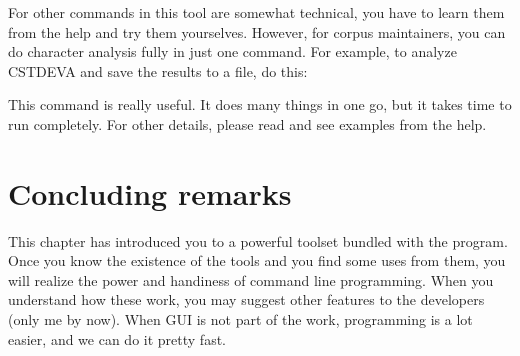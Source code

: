 For other commands in this tool are somewhat technical, you have to learn them from the help and try them yourselves. However, for corpus maintainers, you can do character analysis fully in just one command. For example, to analyze CSTDEVA and save the results to a file, do this:

\newpage
{}

This command is really useful. It does many things in one go, but it takes time to run completely. For other details, please read and see examples from the help.

\section{Concluding remarks}

This chapter has introduced you to a powerful toolset bundled with the program. Once you know the existence of the tools and you find some uses from them, you will realize the power and handiness of command line programming. When you understand how these work, you may suggest other features to the developers (only me by now). When GUI is not part of the work, programming is a lot easier, and we can do it pretty fast.

